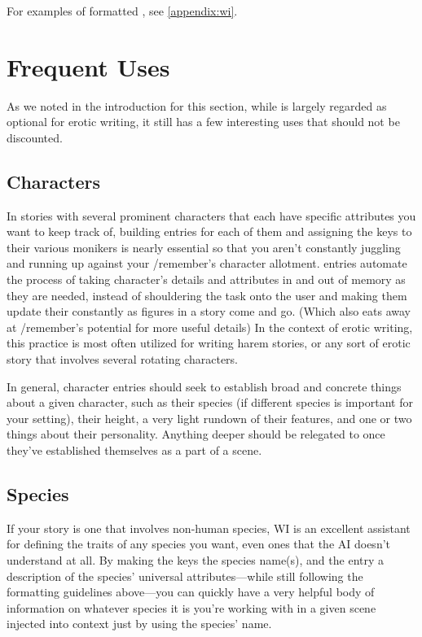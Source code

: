 ﻿\documentclass[Coomer-main.tex]{subfiles}
\begin{document}
For examples of formatted \wi, see \cref{appendix:wi}.

\section{Frequent Uses}

As we noted in the introduction for this section, while \wi is largely regarded as optional for erotic writing, it still has a few interesting uses that should not be discounted.

\subsection{Characters}

In stories with several prominent characters that each have specific attributes you want to keep track of, building \wi entries for each of them and assigning the keys to their various monikers is nearly essential so that you aren’t constantly juggling and running up against your /remember’s character allotment. \wi entries automate the process of taking character’s details and attributes in and out of memory as they are needed, instead of shouldering the task onto the user and making them update their \rem constantly as figures in a story come and go. (Which also eats away at /remember’s potential for more useful details) In the context of erotic writing, this practice is most often utilized for writing harem stories, or any sort of erotic story that involves several rotating characters.

In general, character entries should seek to establish broad and concrete things about a given character, such as their species (if different species is important for your setting), their height, a very light rundown of their features, and one or two things about their personality.
Anything deeper should be relegated to \rem once they've established themselves as a part of a scene.

\subsection{Species}

If your story is one that involves non-human species, WI is an excellent assistant for defining the traits of any species you want, even ones that the AI doesn't understand at all.
By making the keys the species name(s), and the entry a description of the species' universal attributes—while still following the formatting guidelines above—you can quickly have a very helpful body of information on whatever species it is you're working with in a given scene injected into context just by using the species' name.
\end{document}
